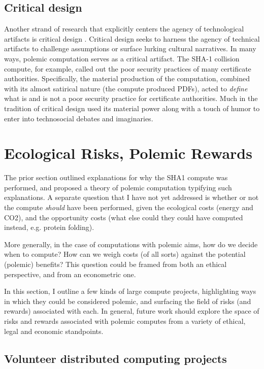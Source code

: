 \documentclass[sigconf]{acmart}
\begin{document}
\subsection{Critical design}
\label{sec:org7ccf681}

Another strand of research that explicitly centers the agency of technological artifacts
is critical design \cite{Dunne2001}.
Critical design seeks to harness the agency of technical artifacts 
to challenge assumptions or surface lurking cultural narratives.
In many ways, polemic computation serves as a critical artifact.
The SHA-1 collision compute, for example, 
called out the poor security practices of many certificate authorities.
Specifically, the material production of the computation,
combined with its almost satirical nature (the compute produced PDFs),
acted to \emph{define} what is and is not a poor security practice for certificate authorities.
Much in the tradition of critical design
used its material power \cite{Bennett2013a} along with a touch of humor to enter into technosocial debates and imaginaries.


\section{Ecological Risks, Polemic Rewards}
\label{sec:orgb3ba397}

The prior section outlined explanations for why the SHA1 compute was performed, 
and proposed a theory of polemic computation typifying such explanations.
A separate question that I have not yet addressed 
is whether or not the compute \emph{should} have been performed,
given the ecological costs (energy and CO2), and the opportunity costs (what else could they could have computed instead, e.g. protein folding). 

More generally, in the case of computations with polemic aims,
how do we decide when to compute?
How can we weigh costs (of all sorts) against the potential (polemic) benefits?
This question could be framed from both an ethical perspective, 
and from an econometric one.

In this section, I outline a few kinds of large compute projects, 
highlighting ways in which they could be considered polemic,
and surfacing the field of risks (and rewards) associated with each.
In general, future work should explore the space of risks and rewards
associated with polemic computes from a variety of ethical, legal and economic standpoints.

\subsection{Volunteer distributed computing projects}
\label{sec:orga3d3a49}
\end{document}
